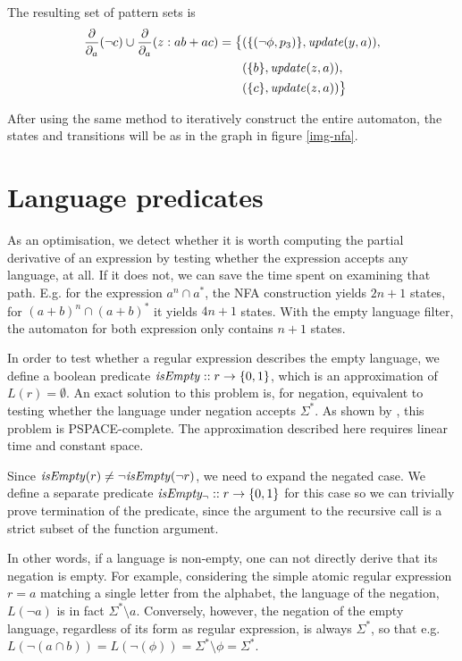 \begin{eg}
   The resulting set of pattern sets is
   \begin{align*}
     \frac{\partial}{\partial_{a}}(\neg c) \cup \frac{\partial}{\partial_{a}}(z:ab + ac) =
     \big\{
     & (\{ (\neg\phi, p_3) \}, \mathit{update}(y, a)), \\
     & (\{ b \}, \mathit{update}(z, a)), \\
     & (\{ c \}, \mathit{update}(z, a))
     \big\}
   \end{align*}

   After using the same method to iteratively construct the entire automaton,
   the states and transitions will be as in the graph in figure \ref{img-nfa}.


\end{eg}


\section{Language predicates}

As an optimisation, we detect whether it is worth computing the partial
derivative of an expression by testing whether the expression accepts any
language, at all. If it does not, we can save the time spent on examining that
path. E.g. for the expression $a^n \cap a^*$, the NFA construction yields $2n +
1$ states, for $(a+b)^n \cap (a+b)^*$ it yields $4n + 1$ states. With the empty
language filter, the automaton for both expression only contains $n + 1$ states.

In order to test whether a regular expression describes the empty language, we
define a boolean predicate $\mathit{isEmpty} :: r \to \{0, 1\}$, which is an
approximation of $L(r) = \emptyset$. An exact solution to this problem is, for
negation, equivalent to testing whether the language under negation accepts
$\Sigma^*$. As shown by \cite{stoc73}, this problem is PSPACE-complete. The
approximation described here requires linear time and constant space.

Since $\mathit{isEmpty}(r) \neq \neg\mathit{isEmpty}(\neg r)$, we need to expand the negated
case. We define a separate predicate $\mathit{isEmpty_\neg} :: r \to \{0, 1\}$ for this
case so we can trivially prove termination of the predicate, since the argument
to the recursive call is a strict subset of the function argument.

In other words, if a language is non-empty, one can not directly derive that its
negation is empty. For example, considering the simple atomic regular expression
$r = a$ matching a single letter from the alphabet, the language of the
negation, $L(\neg a)$ is in fact $\Sigma^* \setminus a$. Conversely, however,
the negation of the empty language, regardless of its form as regular
expression, is always $\Sigma^*$, so that e.g. $L(\neg(a \cap b)) =
L(\neg(\phi)) = \Sigma^* \setminus \phi = \Sigma^*$.

